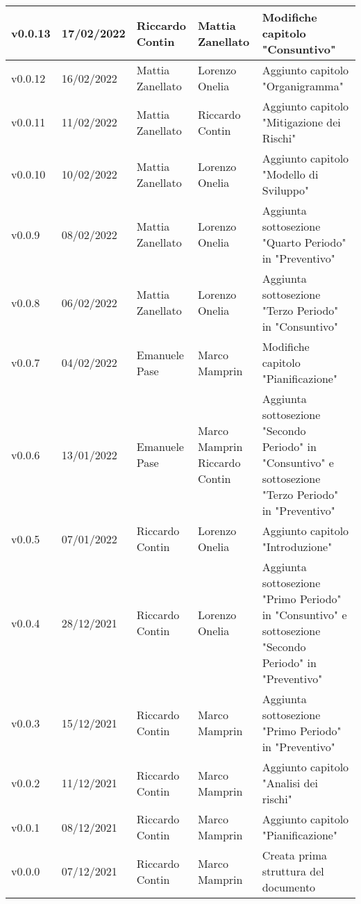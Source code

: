 {\begin{longtable}{|C{1.8cm}|C{2.1cm}|C{2cm}|C{2.4cm}|L{4.4cm}|}
  v0.0.13       & 17/02/2022    & Riccardo Contin   & Mattia Zanellato                & Modifiche capitolo "Consuntivo" \\ \hline
  v0.0.12       & 16/02/2022    & Mattia Zanellato  & Lorenzo Onelia                  & Aggiunto capitolo "Organigramma" \\ \hline
  v0.0.11       & 11/02/2022    & Mattia Zanellato  & Riccardo Contin                 & Aggiunto capitolo "Mitigazione dei Rischi" \\ \hline
  v0.0.10       & 10/02/2022    & Mattia Zanellato  & Lorenzo Onelia                  & Aggiunto capitolo "Modello di Sviluppo" \\ \hline
  v0.0.9        & 08/02/2022    & Mattia Zanellato  & Lorenzo Onelia                  & Aggiunta sottosezione "Quarto Periodo" in "Preventivo" \\ \hline
  v0.0.8        & 06/02/2022    & Mattia Zanellato  & Lorenzo Onelia                  & Aggiunta sottosezione "Terzo Periodo" in "Consuntivo" \\ \hline
  v0.0.7        & 04/02/2022    & Emanuele Pase     & Marco Mamprin                   & Modifiche capitolo "Pianificazione" \\ \hline
  v0.0.6        & 13/01/2022    & Emanuele Pase     & Marco Mamprin Riccardo Contin   & Aggiunta sottosezione "Secondo Periodo" in "Consuntivo" e sottosezione "Terzo Periodo" in "Preventivo" \\ \hline
  v0.0.5        & 07/01/2022    & Riccardo Contin   & Lorenzo Onelia                  & Aggiunto capitolo "Introduzione" \\ \hline
  v0.0.4        & 28/12/2021    & Riccardo Contin   & Lorenzo Onelia                  & Aggiunta sottosezione "Primo Periodo" in "Consuntivo" e sottosezione "Secondo Periodo" in "Preventivo" \\ \hline
  v0.0.3        & 15/12/2021    & Riccardo Contin   & Marco Mamprin                   & Aggiunta sottosezione "Primo Periodo" in "Preventivo" \\ \hline
  v0.0.2        & 11/12/2021    & Riccardo Contin   & Marco Mamprin                   & Aggiunto capitolo "Analisi dei rischi" \\ \hline
  v0.0.1        & 08/12/2021    & Riccardo Contin   & Marco Mamprin                   & Aggiunto capitolo "Pianificazione" \\ \hline
  v0.0.0        & 07/12/2021    & Riccardo Contin   & Marco Mamprin                   & Creata prima struttura del documento \\ \hline
\end{longtable}}

\renewcommand\arraystretch{1}
